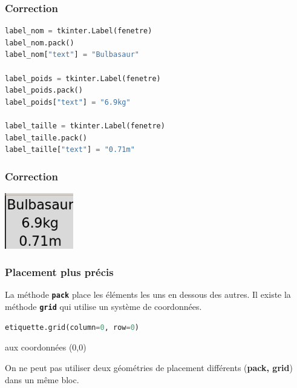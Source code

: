 \documentclass[svgnames,11pt]{beamer}
\begin{document}
\begin{frame}[fragile]
    \frametitle{Correction}
    \begin{center}
        \begin{lstlisting}[language=Python,basicstyle=\small]
label_nom = tkinter.Label(fenetre)
label_nom.pack()
label_nom["text"] = "Bulbasaur"

label_poids = tkinter.Label(fenetre)
label_poids.pack()
label_poids["text"] = "6.9kg"

label_taille = tkinter.Label(fenetre)
label_taille.pack()
label_taille["text"] = "0.71m"
\end{lstlisting}
        \label{CODE}
    \end{center}



\end{frame}
\begin{frame}
    \frametitle{Correction}

    \begin{center}
        \centering
        \includegraphics[width=3cm]{ressources/carte0.png}
        \label{IMG}
    \end{center}

\end{frame}
\begin{frame}[fragile]
    \frametitle{Placement plus précis}
    La méthode \textbf{\texttt{pack}} place les éléments les uns en dessous des autres. Il existe la méthode \textbf{\texttt{grid}} qui utilise un système de coordonnées.
    \begin{center}
        \begin{lstlisting}[language=Python]
etiquette.grid(column=0, row=0)
\end{lstlisting}
         aux coordonnées (0,0)
        \label{CODE}
    \end{center}
    \begin{aretenir}[Commentaire]
        On ne peut pas utiliser deux géométries de placement différents (\textbf{pack, grid}) dans un même bloc.

    \end{aretenir}


\end{frame}
\end{document}
